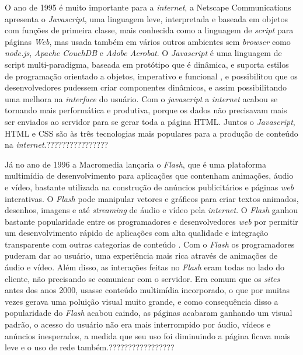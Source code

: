 O ano de 1995 é muito importante para a \textit{internet}, a Netscape Communications apresenta o \textit{Javascript}, uma linguagem leve, interpretada e baseada em objetos com funções de primeira classe, mais conhecida como a linguagem de \textit{script} para páginas \textit{Web}, mas usada também em vários outros ambientes sem \textit{browser} como \textit{node.js},  \textit{Apache CouchDB} e\textit{ Adobe Acrobat}. O \textit{Javascript} é uma linguagem de script multi-paradigma,  baseada em protótipo que é dinâmica, e suporta estilos de programação orientado a objetos, imperativo e funcional \cite{mozilla2018}, e possibilitou que os desenvolvedores pudessem criar componentes dinâmicos, e assim possibilitando uma melhora na \textit{interface} do usuário. Com o \textit{javascript} a \textit{internet} acabou se tornando mais performática e produtiva, porque os dados não precisavam mais ser enviados ao servidor para se gerar toda a página \ac{HTML}. Juntos o \textit{Javascript}, \ac{HTML} e \ac{CSS} são às três tecnologias mais populares para a produção de conteúdo na \textit{internet}.????????????????

Já no ano de 1996 a Macromedia lançaria o \textit{Flash}, que é uma plataforma multimídia de desenvolvimento para aplicações que contenham animações, áudio e vídeo, bastante utilizada na construção de anúncios publicitários e páginas \textit{web} interativas. O \textit{Flash} pode manipular vetores e gráficos para criar textos animados, desenhos, imagens e até \textit{streaming} de áudio e vídeo pela \textit{internet}. O \textit{Flash} ganhou bastante popularidade entre os programadores e desenvolvedores \textit{web} por permitir um desenvolvimento rápido de aplicações com alta qualidade e integração transparente com outras categorias de conteúdo \cite{canaltechFlash2018}. Com o \textit{Flash} os programadores puderam dar ao usuário, uma experiência mais rica através de animações de áudio e vídeo. Além disso, as interações feitas no \textit{Flash} eram todas no lado do cliente, não precisando se comunicar com o servidor. Era comum que os \textit{sites} antes dos anos 2000, usasse conteúdo multimídia incorporado, o que por muitas vezes gerava uma poluição visual muito grande, e como consequência disso a popularidade do \textit{Flash} acabou caindo, as páginas acabaram ganhando um visual padrão, o acesso do usuário não era mais interrompido por áudio, vídeos e anúncios inesperados, a medida que seu uso foi diminuindo a página ficava mais leve e o uso de rede também.?????????????????
\\

